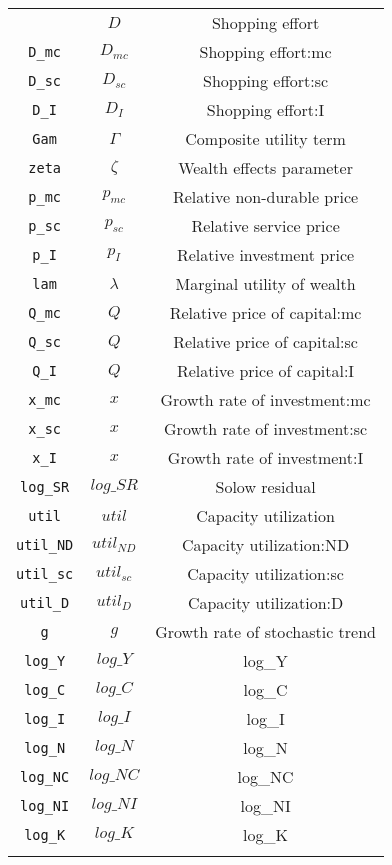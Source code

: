 \begin{center}
\begin{longtable}{ccc}
{\texttt{D} & ${D}$ & Shopping effort\\
\texttt{D\_mc} & ${D_{mc}}$ & Shopping effort:mc\\
\texttt{D\_sc} & ${D_{sc}}$ & Shopping effort:sc\\
\texttt{D\_I} & ${D_I}$ & Shopping effort:I\\
\texttt{Gam} & ${\Gamma}$ & Composite utility term\\
\texttt{zeta} & ${\zeta}$ & Wealth effects parameter\\
\texttt{p\_mc} & ${p_{mc}}$ & Relative non-durable price\\
\texttt{p\_sc} & ${p_{sc}}$ & Relative service price\\
\texttt{p\_I} & ${p_I}$ & Relative investment price\\
\texttt{lam} & ${\lambda}$ & Marginal utility of wealth\\
\texttt{Q\_mc} & ${Q}$ & Relative price of capital:mc\\
\texttt{Q\_sc} & ${Q}$ & Relative price of capital:sc\\
\texttt{Q\_I} & ${Q}$ & Relative price of capital:I\\
\texttt{x\_mc} & ${x}$ & Growth rate of investment:mc\\
\texttt{x\_sc} & ${x}$ & Growth rate of investment:sc\\
\texttt{x\_I} & ${x}$ & Growth rate of investment:I\\
\texttt{log\_SR} & $log\_SR$ & Solow residual\\
\texttt{util} & ${util}$ & Capacity utilization\\
\texttt{util\_ND} & ${util_{ND}}$ & Capacity utilization:ND\\
\texttt{util\_sc} & ${util_{sc}}$ & Capacity utilization:sc\\
\texttt{util\_D} & ${util_D}$ & Capacity utilization:D\\
\texttt{g} & ${g}$ & Growth rate of stochastic trend\\
\texttt{log\_Y} & $log\_Y$ & log\_Y\\
\texttt{log\_C} & $log\_C$ & log\_C\\
\texttt{log\_I} & $log\_I$ & log\_I\\
\texttt{log\_N} & $log\_N$ & log\_N\\
\texttt{log\_NC} & $log\_NC$ & log\_NC\\
\texttt{log\_NI} & $log\_NI$ & log\_NI\\
\texttt{log\_K} & $log\_K$ & log\_K\\
}
\end{longtable}
\end{center}
